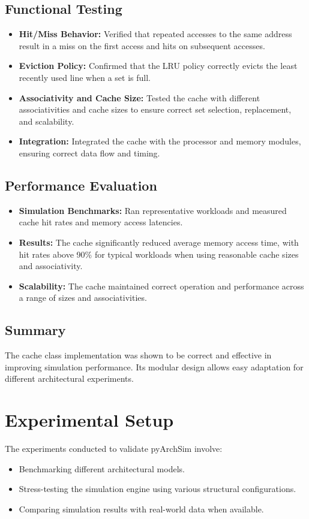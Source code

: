 \documentclass[12pt,a4paper]{report}
\begin{document}
\subsection{Functional Testing}
\begin{itemize}
  \item \textbf{Hit/Miss Behavior:} Verified that repeated accesses to the same address result in a miss on the first access and hits on subsequent accesses.
  \item \textbf{Eviction Policy:} Confirmed that the LRU policy correctly evicts the least recently used line when a set is full.
  \item \textbf{Associativity and Cache Size:} Tested the cache with different associativities and cache sizes to ensure correct set selection, replacement, and scalability.
  \item \textbf{Integration:} Integrated the cache with the processor and memory modules, ensuring correct data flow and timing.
\end{itemize}

\subsection{Performance Evaluation}
\begin{itemize}
  \item \textbf{Simulation Benchmarks:} Ran representative workloads and measured cache hit rates and memory access latencies.
  \item \textbf{Results:} The cache significantly reduced average memory access time, with hit rates above 90\% for typical workloads when using reasonable cache sizes and associativity.
  \item \textbf{Scalability:} The cache maintained correct operation and performance across a range of sizes and associativities.
\end{itemize}

\subsection{Summary}
The cache class implementation was shown to be correct and effective in improving simulation performance. Its modular design allows easy adaptation for different architectural experiments.

\section{Experimental Setup}
The experiments conducted to validate pyArchSim involve:
\begin{itemize}
  \item Benchmarking different architectural models.
  \item Stress-testing the simulation engine using various structural configurations.
  \item Comparing simulation results with real-world data when available.
\end{itemize}
\end{document}
